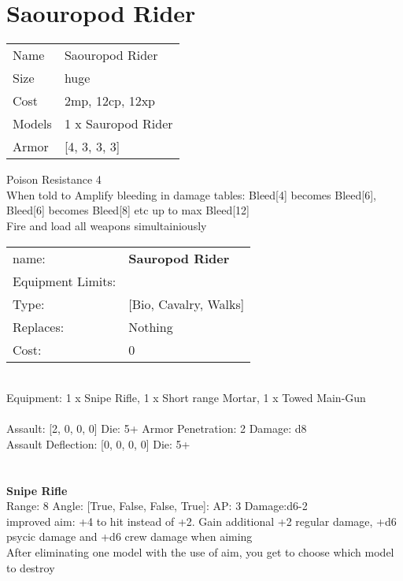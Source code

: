 \pagebreak\pagebreak

\section{ Saouropod Rider }

\begin{tabular}{ll}
  Name & Saouropod Rider \\
  Size & huge\\
  Cost & 2mp, 12cp, 12xp\\
  Models & 1 x Sauropod Rider\\
  Armor & [4, 3, 3, 3]\\
\end{tabular}

\noindent Poison Resistance 4\\ 
When told to Amplify bleeding in damage tables: Bleed[4] becomes Bleed[6], Bleed[6] becomes Bleed[8] etc up to max Bleed[12]\\ 
Fire and load all weapons simultainiously\\ 


\noindent
\begin{tabular}{ll}
name: &{\bf Sauropod Rider } \\
Equipment Limits: & \\
Type: &[Bio, Cavalry, Walks] \\
Replaces: &Nothing \\
Cost: & 0\\
\end{tabular}
\ \\
Equipment: 1 x Snipe Rifle, 1 x Short range Mortar, 1 x Towed Main-Gun \\
\ \\
Assault: [2, 0, 0, 0] Die: 5+ Armor Penetration: 2 Damage: d8 \\
Assault Deflection: [0, 0, 0, 0] Die: 5+\\
\indent  
\ \\

\ \\
{\bf Snipe Rifle } \\



Range: 8  Angle: [True, False, False, True]: AP: 3 Damage:d6-2 \\
improved aim: +4 to hit instead of +2. Gain additional +2 regular damage, +d6 psycic damage and +d6 crew damage when aiming\\ 
After eliminating one model with the use of aim, you get to choose which model to destroy\\ 




